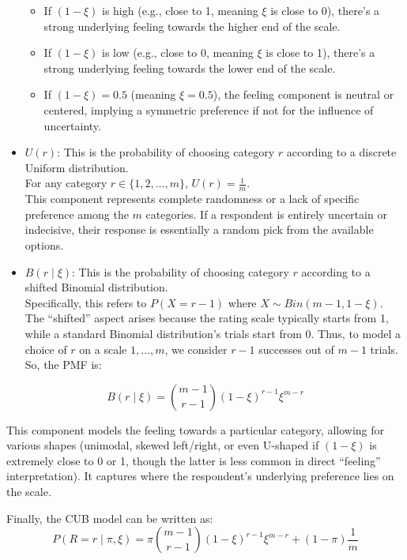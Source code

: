 \documentclass[
  letterpaper,
  DIV=11,
  numbers=noendperiod]{scrartcl}
\providecommand{\tightlist}{%
  \setlength{\itemsep}{0pt}\setlength{\parskip}{0pt}}\usepackage{longtable,booktabs,array}
\begin{document}
\begin{itemize}
  \begin{itemize}
  \tightlist
  \item
    If \((1−\xi)\) is high (e.g., close to 1, meaning \(\xi\) is close
    to 0), there's a strong underlying feeling towards the higher end of
    the scale.
  \item
    If \((1−\xi)\) is low (e.g., close to 0, meaning \(\xi\) is close to
    1), there's a strong underlying feeling towards the lower end of the
    scale.
  \item
    If \((1−\xi) = 0.5\) (meaning \(\xi=0.5\)), the feeling component is
    neutral or centered, implying a symmetric preference if not for the
    influence of uncertainty.
  \end{itemize}
\item
  \(U(r)\): This is the probability of choosing category \(r\) according
  to a discrete Uniform distribution.\\
  For any category \(r\in\{1,2,…,m\}\), \(U(r)= \frac{1}{m}\).\\
  This component represents complete randomness or a lack of specific
  preference among the \(m\) categories. If a respondent is entirely
  uncertain or indecisive, their response is essentially a random pick
  from the available options.
\item
  \(B(r∣\xi)\): This is the probability of choosing category \(r\)
  according to a shifted Binomial distribution.\\
  Specifically, this refers to \(P(X=r−1)\) where
  \(X\sim Bin(m−1,1−\xi)\). The ``shifted'' aspect arises because the
  rating scale typically starts from 1, while a standard Binomial
  distribution's trials start from 0. Thus, to model a choice of \(r\)
  on a scale \(1,…,m\), we consider \(r−1\) successes out of \(m−1\)
  trials.\\
  So, the PMF is:
\end{itemize}

\[
B(r\mid\xi)=\binom{m-1}{r-1}(1-\xi)^{r-1}\xi^{m-r}
\]

This component models the feeling towards a particular category,
allowing for various shapes (unimodal, skewed left/right, or even
U-shaped if \((1−\xi)\) is extremely close to 0 or 1, though the latter
is less common in direct ``feeling'' interpretation). It captures where
the respondent's underlying preference lies on the scale.

Finally, the CUB model can be written as: \[
P(R = r \mid \pi,\xi) = \pi \binom{m-1}{r-1}(1-\xi)^{r-1}\xi^{m-r} + (1-\pi) \frac{1}{m}
\]
\end{document}
